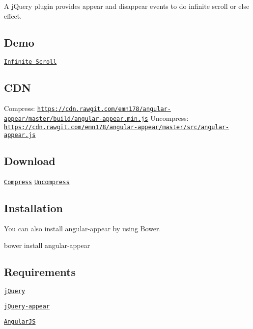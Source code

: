 A j\+Query plugin provides appear and disappear events to do infinite scroll or else effect.

\subsection*{Demo}

\href{https://emn178.github.io/angular-appear/samples/infinite-scroll/}{\tt Infinite Scroll}

\subsection*{C\+DN}

Compress\+: \href{https://cdn.rawgit.com/emn178/angular-appear/master/build/angular-appear.min.js}{\tt https\+://cdn.\+rawgit.\+com/emn178/angular-\/appear/master/build/angular-\/appear.\+min.\+js} Uncompress\+: \href{https://cdn.rawgit.com/emn178/angular-appear/master/src/angular-appear.js}{\tt https\+://cdn.\+rawgit.\+com/emn178/angular-\/appear/master/src/angular-\/appear.\+js}

\subsection*{Download}

\href{https://raw.github.com/emn178/angular-appear/master/build/angular-appear.min.js}{\tt Compress} \href{https://raw.github.com/emn178/angular-appear/master/src/angular-appear.js}{\tt Uncompress}

\subsection*{Installation}

You can also install angular-\/appear by using Bower. 
\begin{DoxyCode}
bower install angular-appear
\end{DoxyCode}


\subsection*{Requirements}


\begin{DoxyItemize}
\item \href{http://jquery.com/}{\tt j\+Query}
\item \href{https://github.com/emn178/jquery-appear}{\tt j\+Query-\/appear}
\item \href{https://angularjs.org/}{\tt Angular\+JS}
\end{DoxyItemize}

